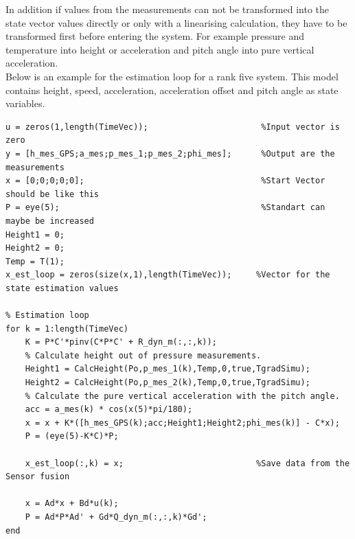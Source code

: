 In addition if values from the measurements can not be transformed into the state vector values directly or only with a linearising calculation,
they have to be transformed first before entering the system.
For example pressure and temperature into height or acceleration and pitch angle into pure vertical acceleration.\\

Below is an example for the estimation loop for a rank five system. This model contains height, speed, acceleration, acceleration offset and pitch angle as state variables.
\begin{lstlisting}[caption={State Estimation Loop}]
% Initalzation
u = zeros(1,length(TimeVec));                       %Input vector is zero
y = [h_mes_GPS;a_mes;p_mes_1;p_mes_2;phi_mes];      %Output are the measurements
x = [0;0;0;0;0];                                    %Start Vector should be like this
P = eye(5);                                         %Standart can maybe be increased
Height1 = 0;
Height2 = 0;
Temp = T(1);
x_est_loop = zeros(size(x,1),length(TimeVec));     %Vector for the state estimation values

% Estimation loop
for k = 1:length(TimeVec)
    K = P*C'*pinv(C*P*C' + R_dyn_m(:,:,k));
    % Calculate height out of pressure measurements.
    Height1 = CalcHeight(Po,p_mes_1(k),Temp,0,true,TgradSimu); 
    Height2 = CalcHeight(Po,p_mes_2(k),Temp,0,true,TgradSimu);
    % Calculate the pure vertical acceleration with the pitch angle.
    acc = a_mes(k) * cos(x(5)*pi/180);		
    x = x + K*([h_mes_GPS(k);acc;Height1;Height2;phi_mes(k)] - C*x);
    P = (eye(5)-K*C)*P;

    x_est_loop(:,k) = x;                           %Save data from the Sensor fusion

    x = Ad*x + Bd*u(k);
    P = Ad*P*Ad' + Gd*Q_dyn_m(:,:,k)*Gd';
end
\end{lstlisting}

